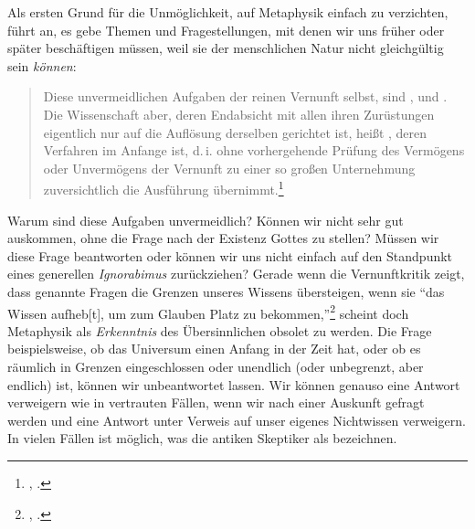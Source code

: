 \begin{nummerierung}
\item\label{subsubsection:UnvermeidlicheAufgabenderMetaphysik}
Als ersten Grund für die Unmöglichkeit, auf Metaphysik einfach zu verzichten,
führt  an, es gebe Themen und Fragestellungen, mit denen
wir uns früher oder später beschäftigen müssen, weil sie der menschlichen
Natur nicht gleichgültig sein \emph{können}:
\begin{quote}
Diese unvermeidlichen Aufgaben der reinen Vernunft selbst, sind ,
 und . Die Wissenschaft aber, deren
Endabsicht mit allen ihren Zurüstungen eigentlich nur auf die Auflösung
derselben gerichtet ist, heißt , deren Verfahren im Anfange
 ist, d.\,i. ohne vorhergehende Prüfung des Vermögens oder
Unvermögens der Vernunft zu einer so großen Unternehmung zuversichtlich die
Ausführung übernimmt.\footnote{\cite[][B 7]{Kant:KritikderreinenVernunft2003},
\cite[][III: 31.6--12]{Kant:GesammelteWerke1900ff.}.}
\end{quote}
Warum sind diese Aufgaben unvermeidlich? Können wir nicht sehr gut auskommen,
ohne die Frage nach der Existenz Gottes zu stellen? Müssen wir diese Frage
beantworten oder können wir uns nicht einfach auf den Standpunkt eines
generellen \emph{Ignorabimus} zurückziehen? Gerade wenn die Vernunftkritik
zeigt, dass genannte Fragen die Grenzen unseres Wissens übersteigen, wenn sie
\enquote{das Wissen aufheb[t], um zum Glauben Platz zu
bekommen,}\footnote{\cite[][B xxx]{Kant:KritikderreinenVernunft2003},
\cite[][III: 19.6]{Kant:GesammelteWerke1900ff.}.} scheint doch Metaphysik als
\emph{Erkenntnis} des Übersinnlichen obsolet zu werden.
Die Frage beispielsweise, ob das Universum einen Anfang in der Zeit hat, oder ob
es räumlich in Grenzen eingeschlossen oder unendlich (oder unbegrenzt, aber
endlich) ist, können wir unbeantwortet lassen. Wir können genauso eine Antwort
verweigern wie in vertrauten Fällen, wenn wir nach einer Auskunft gefragt werden
und eine Antwort unter Verweis auf unser eigenes Nichtwissen verweigern. In
vielen Fällen ist möglich, was die antiken Skeptiker als
{\epoche} bezeichnen.


\end{nummerierung}
